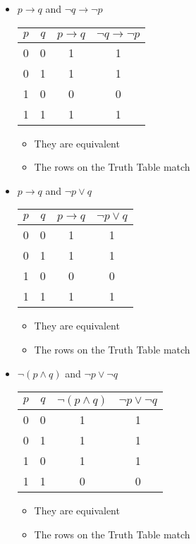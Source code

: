 \documentclass{article}
\begin{document}
\begin{itemize}
    \item $p \to q $ and $\lnot q \to \lnot p$
    
\begin{tabular}{|c|c|c|c|}
\hline
$p$ & $q$ & $p \to q$ & $ \lnot q \to  \lnot p$ \\
\hline
0 & 0 & 1 & 1 \\
0 & 1 & 1 & 1 \\
1 & 0 & 0 & 0 \\
1 & 1 & 1 & 1 \\
\hline
\end{tabular}
\begin{itemize}
    \item They are equivalent
    \item The rows on the Truth Table match
\end{itemize}
\end{itemize}


\begin{itemize}
    \item $p \to q $ and $\lnot p \lor  q$
    
\begin{tabular}{|c|c|c|c|}
\hline
$p$ & $q$ & $p \to q$ & $ \lnot p \lor q$ \\
\hline
0 & 0 & 1 & 1 \\
0 & 1 & 1 & 1 \\
1 & 0 & 0 & 0 \\
1 & 1 & 1 & 1 \\
\hline
\end{tabular}
\begin{itemize}
    \item They are equivalent
    \item The rows on the Truth Table match
\end{itemize}
\end{itemize}


\begin{itemize}
    \item $\lnot (p \land q) $ and $\lnot p \lor \lnot q $
    
\begin{tabular}{|c|c|c|c|}
\hline
$p$ & $q$ & $ \lnot (p \land q)$ & $ \lnot p \lor  \lnot q$ \\
\hline
0 & 0 & 1 & 1 \\
0 & 1 & 1 & 1 \\
1 & 0 & 1 & 1 \\
1 & 1 & 0 & 0 \\
\hline
\end{tabular}
\begin{itemize}
    \item They are equivalent
    \item The rows on the Truth Table match
\end{itemize}
\end{itemize}
\end{document}
